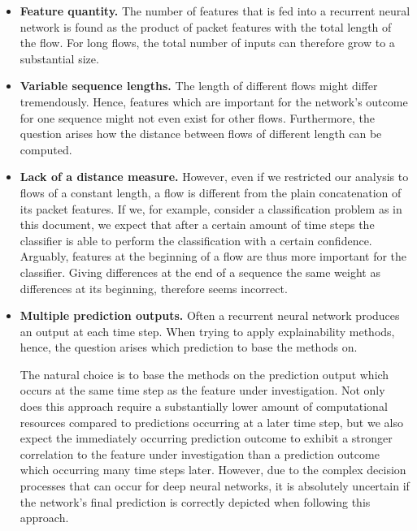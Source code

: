 \documentclass[conference]{IEEEtran}
\begin{document}
\begin{itemize}
\item
\textbf{Feature quantity.}
The number of features that is fed into a recurrent neural network is found as the product of packet features with the total length of the flow. For long flows, the total number of inputs can therefore grow to a substantial size.

\item
\textbf{Variable sequence lengths.}
The length of different flows might differ tremendously. Hence, features which are important for the network's outcome for one sequence might not even exist for other flows. Furthermore, the question arises how the distance between flows of different length can be computed.

\item
\textbf{Lack of a distance measure.}
However, even if we restricted our analysis to flows of a constant length, a flow is different from the plain concatenation of its packet features.
If we, for example, consider a classification problem as in this document, we expect that after a certain amount of time steps the classifier is able to perform the classification with a certain confidence. Arguably, features at the beginning of a flow are thus more important for the classifier. Giving differences at the end of a sequence the same weight as differences at its beginning, therefore seems incorrect.

\item
\textbf{Multiple prediction outputs.}
Often a recurrent neural network produces an output at each time step. When trying to apply explainability methods, hence, the question arises which prediction to base the methods on.

The natural choice is to base the methods on the prediction output which occurs at the same time step as the feature under investigation. Not only does this approach require a substantially lower amount of computational resources compared to predictions occurring at a later time step, but we also expect the immediately occurring prediction outcome to exhibit a stronger correlation to the feature under investigation than a prediction outcome which occurring many time steps later. However, due to the complex decision processes that can occur for deep neural networks, it is absolutely  uncertain if the network's final prediction is correctly depicted when following this approach.
\end{itemize}
\end{document}
